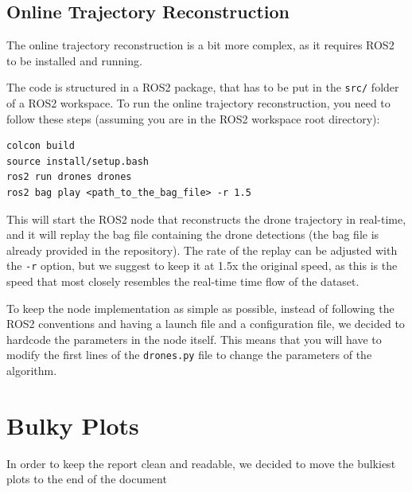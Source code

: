 \documentclass[11pt]{article}
\begin{document}
\subsection{Online Trajectory Reconstruction}

The online trajectory reconstruction is a bit more complex, as it requires ROS2 to be installed and running. 

The code is structured in a ROS2 package, that has to be put in the \texttt{src/} folder of a ROS2 workspace. To run the online trajectory reconstruction, you need to follow these steps (assuming you are in the ROS2 workspace root directory):

\begin{verbatim}
colcon build
source install/setup.bash
ros2 run drones drones
ros2 bag play <path_to_the_bag_file> -r 1.5
\end{verbatim}

This will start the ROS2 node that reconstructs the drone trajectory in real-time, and it will replay the bag file containing the drone detections (the bag file is already provided in the repository). The rate of the replay can be adjusted with the \texttt{-r} option, but we suggest to keep it at 1.5x the original speed, as this is the speed that most closely resembles the real-time time flow of the dataset.

To keep the node implementation as simple as possible, instead of following the ROS2 conventions and having a launch file and a configuration file, we decided to hardcode the parameters in the node itself. This means that you will have to modify the first lines of the \texttt{drones.py} file to change the parameters of the algorithm.

\section*{Bulky Plots}

In order to keep the report clean and readable, we decided to move the bulkiest plots to the end of the document
\end{document}
